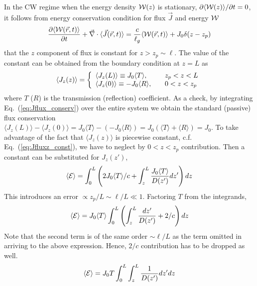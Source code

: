 In the CW regime when the energy density ${\cal W}(z)$ is stationary, $\partial \langle {\cal W}(z)\rangle/\partial t=0$, it follows from energy conservation condition for flux $\vec{J}$ and energy ${\cal W}$
\begin{equation}
\frac{\partial \langle {\cal W}(\vec{r},t)\rangle }{\partial t}+\vec{\nabla} \cdot \langle\vec{J}(\vec{r},t)\rangle=
\frac{c}{\ell_g}\langle {\cal W}(\vec{r},t)\rangle+J_0 \delta(z-z_p)
\label{eq:Jflux_conserv}
\end{equation}
 that the $z$ component of flux is constant for $z>z_p\sim\ell$. The value of the constant can be obtained from the boundary condition at $z=L$ as
\begin{equation}
\langle J_z(z)\rangle=\left\{
\begin{array}{l l}
\langle J_z(L)\rangle\equiv J_0 \langle T \rangle ,&\quad z_p<z<L\\
\langle J_z(0)\rangle\equiv -J_0 \langle R \rangle,&\quad 0<z<z_p\\
\end{array} \right.
\label{eq:Jfluxz_const}
\end{equation}
where $T$ ($R$) is the transmission (reflection) coefficient. As a check, by integrating Eq.~(\ref{eq:Jflux_conserv}) over the entire system we obtain the standard (passive) flux conservation $\langle J_z(L)\rangle -\langle J_z(0)\rangle =J_0 \langle T \rangle-(-J_0 \langle R \rangle)=J_0(\langle T \rangle+\langle R \rangle)=J_0$. To take advantage of the fact that $\langle J_z(z)\rangle$ is piecewise constant, c.f. Eq.~(\ref{eq:Jfluxz_const}), we have to neglect by $0<z<z_p$ contribution. Then a constant can be substituted for $J_z(z')$,
\begin{equation}
\langle {\cal E} \rangle = \int_0^L \left( 2J_0\langle T \rangle/c + \int_z^L\frac{J_0 \langle T \rangle }{D(z^\prime)}dz^\prime\right) dz
\end{equation}
This introduces an error $\propto z_p/L\sim\ell/L\ll 1$. Factoring $T$ from the integrands,
\begin{equation}
\langle {\cal E} \rangle =J_0\langle T \rangle\int_0^L \left( \int_z^L\frac{dz^\prime}{D(z^\prime)}+2/c\right) dz
\label{eq:E1a}
\end{equation}
Note that the second term is of the same order $\sim \ell/L$ as the term omitted in arriving to the above expression. Hence, $2/c$ contribution has to be dropped as well.
\begin{equation}
\langle {\cal E} \rangle =J_0T\int_0^L \int_z^L \frac{1}{D(z^\prime)}dz^\prime dz
\end{equation}

